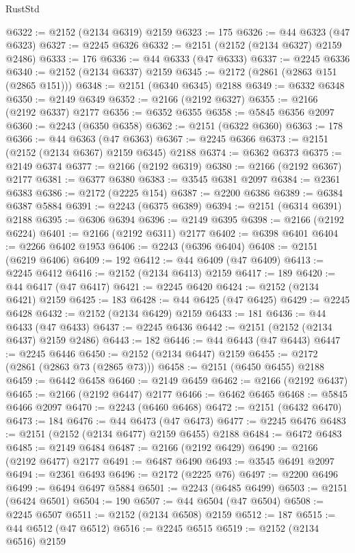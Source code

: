 \begin{lexlean}{RustStd}
\begin{coremodule}
@6322 := @2152 (@2134 @6319) @2159
@6323 := 175
@6326 := @44 @6323 (@47 @6323)
@6327 := @2245 @6326
@6332 := @2151 (@2152 (@2134 @6327) @2159 @2486)
@6333 := 176
@6336 := @44 @6333 (@47 @6333)
@6337 := @2245 @6336
@6340 := @2152 (@2134 @6337) @2159
@6345 := @2172 (@2861 (@2863 @151 (@2865 @151)))
@6348 := @2151 (@6340 @6345) @2188
@6349 := @6332 @6348
@6350 := @2149 @6349
@6352 := @2166 (@2192 @6327)
@6355 := @2166 (@2192 @6337) @2177
@6356 := @6352 @6355
@6358 := @5845 @6356 @2097
@6360 := @2243 (@6350 @6358)
@6362 := @2151 (@6322 @6360)
@6363 := 178
@6366 := @44 @6363 (@47 @6363)
@6367 := @2245 @6366
@6373 := @2151 (@2152 (@2134 @6367) @2159 @6345) @2188
@6374 := @6362 @6373
@6375 := @2149 @6374
@6377 := @2166 (@2192 @6319)
@6380 := @2166 (@2192 @6367) @2177
@6381 := @6377 @6380
@6383 := @3545 @6381 @2097
@6384 := @2361 @6383
@6386 := @2172 (@2225 @154)
@6387 := @2200 @6386
@6389 := @6384 @6387 @5884
@6391 := @2243 (@6375 @6389)
@6394 := @2151 (@6314 @6391) @2188
@6395 := @6306 @6394
@6396 := @2149 @6395
@6398 := @2166 (@2192 @6224)
@6401 := @2166 (@2192 @6311) @2177
@6402 := @6398 @6401
@6404 := @2266 @6402 @1953
@6406 := @2243 (@6396 @6404)
@6408 := @2151 (@6219 @6406)
@6409 := 192
@6412 := @44 @6409 (@47 @6409)
@6413 := @2245 @6412
@6416 := @2152 (@2134 @6413) @2159
@6417 := 189
@6420 := @44 @6417 (@47 @6417)
@6421 := @2245 @6420
@6424 := @2152 (@2134 @6421) @2159
@6425 := 183
@6428 := @44 @6425 (@47 @6425)
@6429 := @2245 @6428
@6432 := @2152 (@2134 @6429) @2159
@6433 := 181
@6436 := @44 @6433 (@47 @6433)
@6437 := @2245 @6436
@6442 := @2151 (@2152 (@2134 @6437) @2159 @2486)
@6443 := 182
@6446 := @44 @6443 (@47 @6443)
@6447 := @2245 @6446
@6450 := @2152 (@2134 @6447) @2159
@6455 := @2172 (@2861 (@2863 @73 (@2865 @73)))
@6458 := @2151 (@6450 @6455) @2188
@6459 := @6442 @6458
@6460 := @2149 @6459
@6462 := @2166 (@2192 @6437)
@6465 := @2166 (@2192 @6447) @2177
@6466 := @6462 @6465
@6468 := @5845 @6466 @2097
@6470 := @2243 (@6460 @6468)
@6472 := @2151 (@6432 @6470)
@6473 := 184
@6476 := @44 @6473 (@47 @6473)
@6477 := @2245 @6476
@6483 := @2151 (@2152 (@2134 @6477) @2159 @6455) @2188
@6484 := @6472 @6483
@6485 := @2149 @6484
@6487 := @2166 (@2192 @6429)
@6490 := @2166 (@2192 @6477) @2177
@6491 := @6487 @6490
@6493 := @3545 @6491 @2097
@6494 := @2361 @6493
@6496 := @2172 (@2225 @76)
@6497 := @2200 @6496
@6499 := @6494 @6497 @5884
@6501 := @2243 (@6485 @6499)
@6503 := @2151 (@6424 @6501)
@6504 := 190
@6507 := @44 @6504 (@47 @6504)
@6508 := @2245 @6507
@6511 := @2152 (@2134 @6508) @2159
@6512 := 187
@6515 := @44 @6512 (@47 @6512)
@6516 := @2245 @6515
@6519 := @2152 (@2134 @6516) @2159

\end{coremodule}
\end{lexlean}
